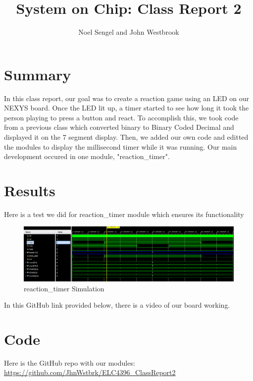 \documentclass[11pt]{article}
\begin{document}
\title{System on Chip: Class Report 2}
\author{Noel Sengel and John Westbrook}

\maketitle


\section*{Summary}

In this class report, our goal was to create a reaction game using an LED on our NEXYS board. Once the LED lit up, a timer started to see how long it took the person playing to press a button and react. To accomplish this, we took code from a previous class which converted binary to Binary Coded Decimal and displayed it on the 7 segment display. Then, we added our own code and editted the modules to display the millisecond timer while it was running. Our main development occured in one module, "reaction\_timer".


\section*{Results}

Here is a test we did for reaction\_timer module which ensures its functionality
\begin{figure}[ht]\centering
	\includegraphics[width=\textwidth]{image_2023-09-14_215312515.png}
	\caption{reaction\_timer Simulation}
	\label{fig1}
\end{figure}

In this GitHub link provided below, there is a video of our board working.
\section*{Code}

Here is the GitHub repo with our modules: 
\url{https://github.com/JhnWstbrk/ELC4396_ClassReport2}
\end{document}
